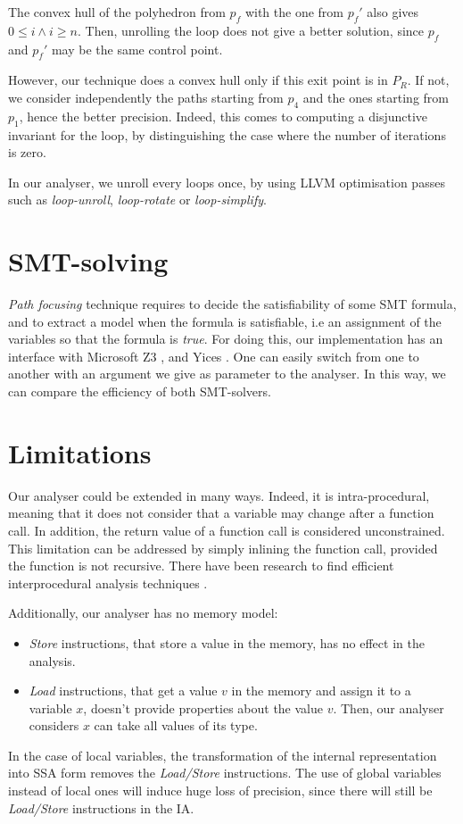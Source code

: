 \documentclass[a4paper,english,titlepage,11pt]{report}
\begin{document}
The convex hull of the polyhedron from $p_f$ with the one from $p_f'$ also gives
$0 \leq i \wedge i \geq n$. Then, unrolling the loop does not give a better
solution, since
$p_f$ and $p_f'$ may be the same control point.

However, our technique does a convex hull only if this exit point is in $P_R$. 
If not, we consider independently the paths starting from $p_4$ and the ones
starting from $p_1$, hence the better precision. Indeed, this comes to computing
a disjunctive invariant for the loop, by distinguishing the case where the
number of iterations is zero. 

In our analyser, we unroll every loops once, by using LLVM optimisation
passes such as \emph{loop-unroll}, \emph{loop-rotate} or \emph{loop-simplify}.


	\section{SMT-solving}

	\emph{Path focusing} technique requires to decide the satisfiability of some
	SMT formula, and to extract a model when the formula is satisfiable, i.e an
	assignment of the variables so that the formula is \emph{true}. For doing
	this, our implementation has an interface with Microsoft Z3 \cite{MouraB08},
	and Yices \cite{DutertreM06}. One can easily switch from one to another with
	an argument we give as parameter to the analyser. In this way, we can
	compare the efficiency of both SMT-solvers.

	\section{Limitations}

	Our analyser could be extended in many ways. Indeed, it is intra-procedural,
	meaning that it does not consider that a variable may change after a
	function call. In addition, the return value of a function call is
	considered unconstrained. This limitation can be addressed by simply
	inlining the function call, provided the function is not recursive.
	There have been research to find efficient interprocedural analysis
	techniques \cite{Bourdoncle90,Bou92,jeannet09b}.

	Additionally, our analyser has no memory model:
\begin{itemize}
\item \emph{Store} instructions, that store a value in the memory, has no effect
in the analysis.
\item \emph{Load} instructions, that get a value $v$ in the memory and assign it
to a variable $x$, doesn't provide properties about the value $v$. Then, our
analyser considers $x$ can take all values of its type.
\end{itemize}
In the case of local variables, the transformation of the internal
representation into SSA form removes the \emph{Load/Store} instructions.
The use of global variables instead of local ones will induce huge
loss of precision, since there will still be \emph{Load/Store} instructions in
the IA.
\end{document}

